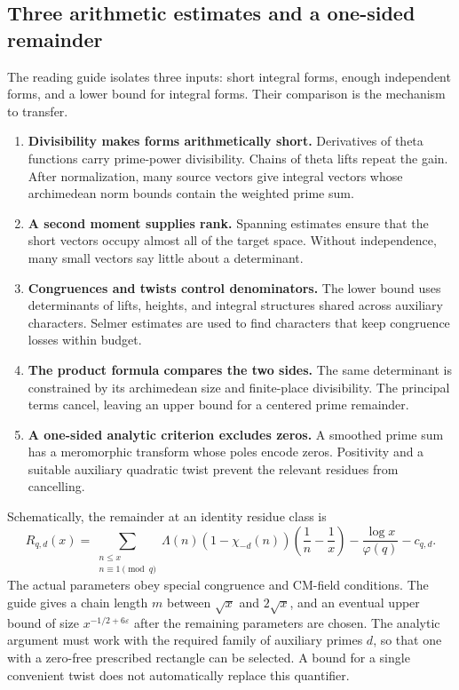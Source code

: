 \subsection{Three arithmetic estimates and a one-sided remainder}

The reading guide isolates three inputs: short integral forms, enough independent forms, and a lower bound for integral forms. Their comparison is the mechanism to transfer.\cite{guide}

\begin{enumerate}
\item \textbf{Divisibility makes forms arithmetically short.} Derivatives of theta functions carry prime-power divisibility. Chains of theta lifts repeat the gain. After normalization, many source vectors give integral vectors whose archimedean norm bounds contain the weighted prime sum.
\item \textbf{A second moment supplies rank.} Spanning estimates ensure that the short vectors occupy almost all of the target space. Without independence, many small vectors say little about a determinant.
\item \textbf{Congruences and twists control denominators.} The lower bound uses determinants of lifts, heights, and integral structures shared across auxiliary characters. Selmer estimates are used to find characters that keep congruence losses within budget.
\item \textbf{The product formula compares the two sides.} The same determinant is constrained by its archimedean size and finite-place divisibility. The principal terms cancel, leaving an upper bound for a centered prime remainder.
\item \textbf{A one-sided analytic criterion excludes zeros.} A smoothed prime sum has a meromorphic transform whose poles encode zeros. Positivity and a suitable auxiliary quadratic twist prevent the relevant residues from cancelling.
\end{enumerate}

Schematically, the remainder at an identity residue class is
\[
 R_{q,d}(x)=
 \sum_{\substack{n\le x\\ n\equiv1\pmod q}}
 \Lambda(n)(1-\chi_{-d}(n))
       \left(\frac1n-\frac1x\right)
 -\frac{\log x}{\varphi(q)}-c_{q,d}.
\]
The actual parameters obey special congruence and CM-field conditions. The guide gives a chain length $m$ between $\sqrt x$ and $2\sqrt x$, and an eventual upper bound of size $x^{-1/2+6\varepsilon}$ after the remaining parameters are chosen. The analytic argument must work with the required family of auxiliary primes $d$, so that one with a zero-free prescribed rectangle can be selected. A bound for a single convenient twist does not automatically replace this quantifier.\cite{guide}


